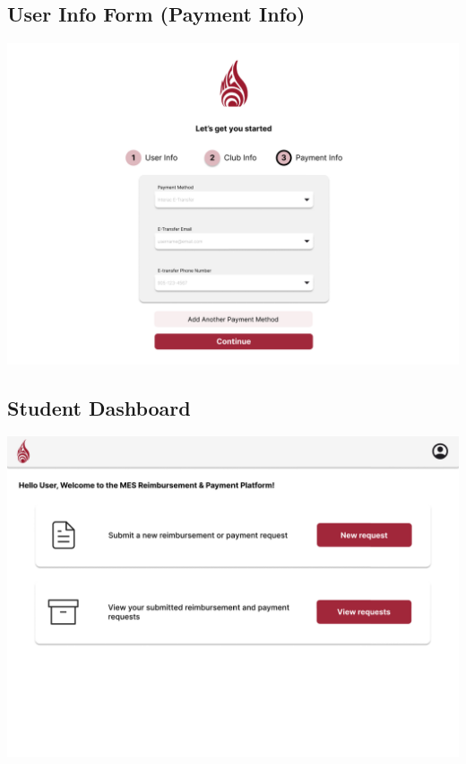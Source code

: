 \documentclass[12pt, titlepage]{article}
\begin{document}
\subsection{User Info Form (Payment Info)}
\includegraphics[]{imgs/UserInfoForm-Payment.png}

\subsection{Student Dashboard}
\includegraphics[]{imgs/StudentDashboard.png}
\end{document}

